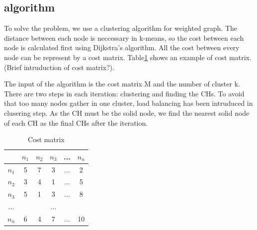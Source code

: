\documentclass[conference]{IEEEtran}
\begin{document}
\subsection{algorithm}

To solve the problem, we use a clustering algorithm for weighted graph. The distance between each node is neccessary in k-means, so the cost between each node is calculated first using Dijkstra's algorithm. All the cost between every node can be represent by a cost matrix. Table\ref{cost_matrix} shows an example of cost matrix. (Brief intruduction of cost matrix?).

The input of the algorithm is the cost matrix M and the number of cluster k. There are two steps in each iteration: clustering and finding the CHs. To avoid that too many nodes gather in one cluster, load balancing has been intruduced in clusering step. As the CH must be the solid node, we find the nearest solid node of each CH as the final CHs after the iteration.

\begin{table}[htbp]
\centering
\begin{tabular}{|c|c|c|c|c|c|}
\hline
 & $n_1$ & $n_2$ & $n_3$ & ... & $n_n$ \\
\hline
$n_1$ & 5 & 7 & 3 & ... & 2 \\
\hline
$n_2$ & 3 & 4 & 1 & ... & 5 \\
\hline
$n_3$ & 5 & 1 & 3 & ... & 8 \\
\hline
... & \multicolumn{5}{c|}{...} \\
\hline
$n_n$ & 6 & 4 & 7 & ... & 10 \\
\hline
\end{tabular}
\caption{Cost matrix}
\label{cost_matrix}
\end{table}
\end{document}
